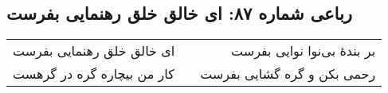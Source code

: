 \begin{center}
\section*{رباعی شماره ۸۷: ای خالق خلق رهنمایی بفرست}
\label{sec:sh087}
\begin{longtable}{l p{0.5cm} r}
ای خالق خلق رهنمایی بفرست
&&
بر بندهٔ بی‌نوا نوایی بفرست
\\
کار من بیچاره گره در گرهست
&&
رحمی بکن و گره گشایی بفرست
\\
\end{longtable}
\end{center}
